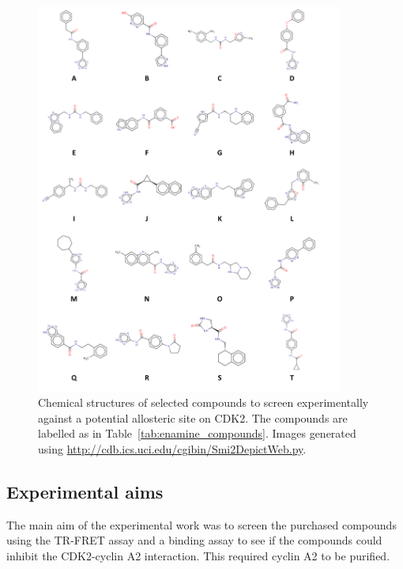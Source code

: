 \begin{figure}
\centering

\includegraphics[width=0.9\textwidth]{figures/compound_structures/compound_structures}

\caption[Chemical structures of selected compounds to screen experimentally against a potential allosteric site on CDK2]
{Chemical structures of selected compounds to screen experimentally against a potential allosteric site on CDK2.
The compounds are labelled as in Table~\ref{tab:enamine_compounds}.
Images generated using \url{http://cdb.ics.uci.edu/cgibin/Smi2DepictWeb.py}.}

\label{fig:compound_structures}
\end{figure}


\subsection{Experimental aims}

The main aim of the experimental work was to screen the purchased compounds using the TR-FRET assay and a binding assay to see if the compounds could inhibit the CDK2-cyclin A2 interaction.
This required cyclin A2 to be purified.



